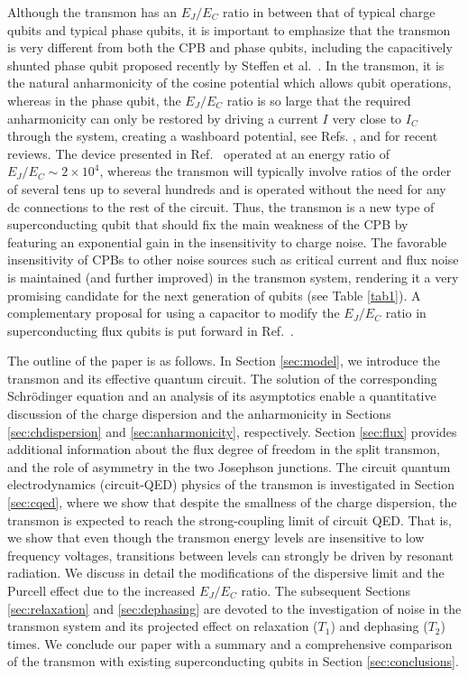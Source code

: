 \documentclass[twocolumn,amsmath,amssymb,floatfix,pra,showpacs,eqsecnum,footinbib,superscriptaddress]{revtex4}
\begin{document}
Although the transmon has an $E_J/E_C$ ratio in between that of typical charge qubits and typical phase qubits, it is important to emphasize that the transmon is very different from both the CPB and phase qubits, including the capacitively shunted phase qubit proposed recently by Steffen et al.\ \cite{steffen}.  In the transmon, it is the natural anharmonicity of the cosine potential which allows qubit operations, whereas in the phase qubit, the $E_J/E_C$ ratio is so large that the required anharmonicity can only be restored by driving a current $I$ very close to $I_C$ through the system, creating a washboard potential, see Refs. \cite{makhlin}, \cite{devoret1} and \cite{you} for recent reviews.  The device presented in Ref.~\cite{steffen} operated at an energy ratio of $E_J/E_C \sim2\times10^4$, whereas the transmon will typically involve ratios of the order of several tens up to several hundreds and is operated without the need for any dc connections to the rest of the circuit. 
Thus, the transmon is a new type of superconducting qubit that should fix the main weakness of the CPB by featuring an exponential gain in the insensitivity to charge noise. The favorable insensitivity of CPBs to other noise sources such as critical current and flux noise is maintained (and further improved) in the transmon system, rendering it a very promising candidate for the next generation of qubits (see Table \ref{tab1}). 
A complementary proposal for using a capacitor to modify the $E_J/E_C$ ratio in superconducting flux qubits is put forward in Ref.~\cite{you2}.

The outline of the paper is as follows.  In Section \ref{sec:model}, we introduce the transmon and its effective quantum circuit. The solution of the corresponding Schr\"odinger equation and an analysis of its asymptotics enable a quantitative discussion of the charge dispersion and the anharmonicity in Sections \ref{sec:chdispersion} and \ref{sec:anharmonicity}, respectively. Section \ref{sec:flux} provides additional information about the flux degree of freedom in the split transmon, and the role of asymmetry in the two Josephson junctions. The circuit quantum electrodynamics (circuit-QED) physics \cite{blais1} of the transmon is investigated in Section \ref{sec:cqed}, where we show that despite the smallness of the charge dispersion, the transmon is expected to reach the strong-coupling limit of circuit QED. That is, we show that even though the transmon energy levels are insensitive to low frequency voltages, transitions between levels can strongly be driven by resonant radiation. We discuss in detail the modifications of the dispersive limit and the Purcell effect due to the increased $E_J/E_C$ ratio. The subsequent Sections \ref{sec:relaxation} and \ref{sec:dephasing} are devoted to the investigation of noise in the transmon system and its projected effect on relaxation ($T_1$) and dephasing ($T_2$) times. We conclude our paper with a summary and a comprehensive comparison of the transmon with existing superconducting qubits in Section \ref{sec:conclusions}. 
\end{document}
